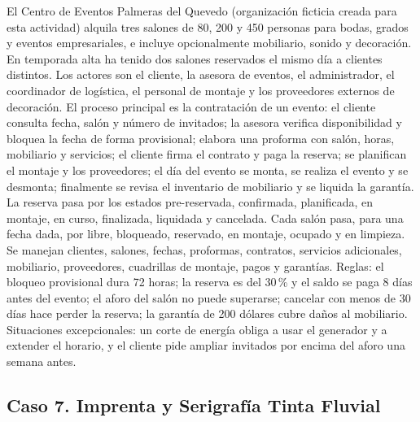 \documentclass[11pt]{article}
\newcommand{\subseccion}[1]{\subsection{\textcolor{midblue}{#1}}}
\begin{document}
El Centro de Eventos Palmeras del Quevedo (organización ficticia creada para esta actividad) alquila tres salones de 80, 200 y 450 personas para bodas, grados y eventos empresariales, e incluye opcionalmente mobiliario, sonido y decoración. En temporada alta ha tenido dos salones reservados el mismo día a clientes distintos. Los actores son el cliente, la asesora de eventos, el administrador, el coordinador de logística, el personal de montaje y los proveedores externos de decoración. El proceso principal es la contratación de un evento: el cliente consulta fecha, salón y número de invitados; la asesora verifica disponibilidad y bloquea la fecha de forma provisional; elabora una proforma con salón, horas, mobiliario y servicios; el cliente firma el contrato y paga la reserva; se planifican el montaje y los proveedores; el día del evento se monta, se realiza el evento y se desmonta; finalmente se revisa el inventario de mobiliario y se liquida la garantía. La reserva pasa por los estados pre-reservada, confirmada, planificada, en montaje, en curso, finalizada, liquidada y cancelada. Cada salón pasa, para una fecha dada, por libre, bloqueado, reservado, en montaje, ocupado y en limpieza. Se manejan clientes, salones, fechas, proformas, contratos, servicios adicionales, mobiliario, proveedores, cuadrillas de montaje, pagos y garantías. Reglas: el bloqueo provisional dura 72 horas; la reserva es del 30\,\% y el saldo se paga 8 días antes del evento; el aforo del salón no puede superarse; cancelar con menos de 30 días hace perder la reserva; la garantía de 200 dólares cubre daños al mobiliario. Situaciones excepcionales: un corte de energía obliga a usar el generador y a extender el horario, y el cliente pide ampliar invitados por encima del aforo una semana antes.

\subseccion{Caso 7. Imprenta y Serigrafía Tinta Fluvial}
\end{document}
